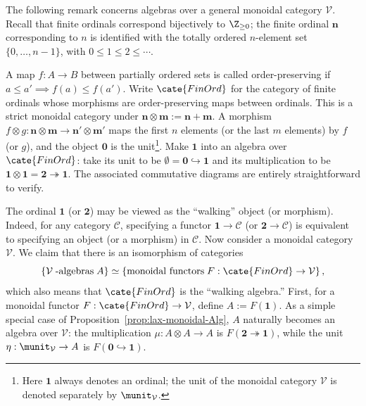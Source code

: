 The following remark concerns algebras over a general monoidal category
$\mathcal{V}$. Recall that finite ordinals correspond bijectively to
$\Z_{\geq0}$; the finite ordinal $\mathbf{n}$ corresponding to $n$ is
identified with the totally ordered $n$-element set $\{0,\ldots,n-1\}$, with
$0\leq1\leq2\leq\cdots$.

\begin{remark}\label{rem:walking-algebra}
	A map $f:A\to B$ between partially ordered sets is called
	order-preserving if
	$a\leq a'\implies f(a)\leq f(a')$. Write $\cate{FinOrd}$ for the category
	of finite ordinals whose morphisms are order-preserving maps between
	ordinals. This is a strict monoidal category under
	$\mathbf{n}\otimes\mathbf{m}:=\mathbf{n}+\mathbf{m}$. A morphism
	$f\otimes g:\mathbf{n}\otimes\mathbf{m}\to\mathbf{n}'\otimes\mathbf{m}'$
	maps the first $n$ elements (or the last $m$ elements) by $f$ (or $g$),
	and the object $\mathbf{0}$ is the unit\footnote{Here $\mathbf{1}$ always
	denotes an ordinal; the unit of the monoidal category $\mathcal{V}$ is
	denoted separately by $\munit_{\mathcal{V}}$.}. Make $\mathbf{1}$ into
	an algebra over $\cate{FinOrd}$: take its unit to be
	$\emptyset=\mathbf{0}\hookrightarrow\mathbf{1}$ and its multiplication
	to be
	$\mathbf{1}\otimes\mathbf{1}=\mathbf{2}\twoheadrightarrow\mathbf{1}$.
	The associated commutative diagrams are entirely straightforward to
	verify.
	
	The ordinal $\mathbf{1}$ (or $\mathbf{2}$) may be viewed as the “walking”
	object (or morphism). Indeed, for any category $\mathcal{C}$, specifying
	a functor $\mathbf{1}\to\mathcal{C}$ (or
	$\mathbf{2}\to\mathcal{C}$) is equivalent to specifying an object (or a
	morphism) in $\mathcal{C}$. Now consider a monoidal category
	$\mathcal{V}$. We claim that there is an isomorphism of categories
	\[
		\left\{ \mathcal{V}\;\text{-algebras}\; A \right\} \simeq \left\{ \text{monoidal functors}\; F: \cate{FinOrd} \to \mathcal{V} \right\},
	\]
	which also means that $\cate{FinOrd}$ is the “walking algebra.” First, for
	a monoidal functor $F:\cate{FinOrd}\to\mathcal{V}$, define
	$A:=F(\mathbf{1})$. As a simple special case of
	Proposition~\ref{prop:lax-monoidal-Alg}, $A$ naturally becomes an algebra
	over $\mathcal{V}$: the multiplication $\mu:A\otimes A\to A$ is
	$F(\mathbf{2}\twoheadrightarrow\mathbf{1})$, while the unit
	$\eta:\munit_{\mathcal{V}}\to A$ is
	$F(\mathbf{0}\hookrightarrow\mathbf{1})$.
	

\end{remark}
